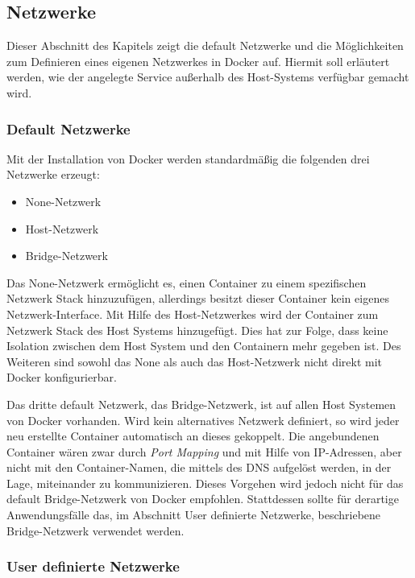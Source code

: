 \subsection{Netzwerke}

Dieser Abschnitt des Kapitels zeigt die default Netzwerke und die Möglichkeiten zum Definieren eines eigenen Netzwerkes in Docker auf.
Hiermit soll erläutert werden, wie der angelegte Service außerhalb des Host-Systems verfügbar gemacht wird.

\subsubsection{Default Netzwerke}

Mit der Installation von Docker werden standardmäßig die folgenden drei Netzwerke erzeugt:

\begin{itemize}
	\item None-Netzwerk
	\item Host-Netzwerk
	\item Bridge-Netzwerk
\end{itemize}

Das None-Netzwerk ermöglicht es, einen Container zu einem spezifischen Netzwerk Stack hinzuzufügen, allerdings besitzt dieser Container kein eigenes Netzwerk-Interface. 
Mit Hilfe des Host-Netzwerkes wird der Container zum Netzwerk Stack des Host Systems hinzugefügt.
Dies hat zur Folge, dass keine Isolation zwischen dem Host System und den Containern mehr gegeben ist.
Des Weiteren sind sowohl das None als auch das Host-Netzwerk nicht direkt mit Docker konfigurierbar.

Das dritte default Netzwerk, das Bridge-Netzwerk, ist auf allen Host Systemen von Docker vorhanden.
Wird kein alternatives Netzwerk definiert, so wird jeder neu erstellte Container automatisch an dieses gekoppelt.
Die angebundenen Container wären zwar durch \textit{Port Mapping} und mit Hilfe von IP-Adressen, aber nicht mit den Container-Namen, die mittels des \ac{DNS} aufgelöst werden, in der Lage, miteinander zu kommunizieren. Dieses Vorgehen wird jedoch nicht für das default Bridge-Netzwerk von Docker empfohlen.
Stattdessen sollte für derartige Anwendungsfälle das, im Abschnitt User definierte Netzwerke, beschriebene Bridge-Netzwerk verwendet werden.

\subsubsection{User definierte Netzwerke}

